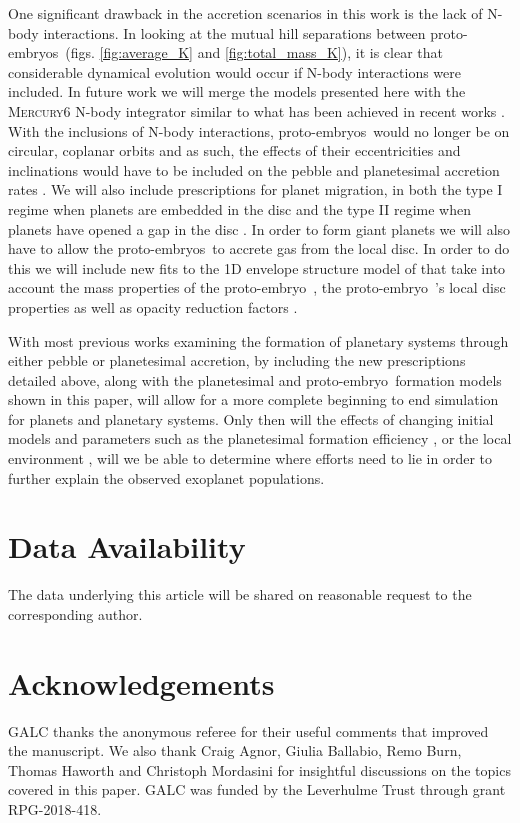 \documentclass[a4paper,fleqn,usenatbib]{mnras}
\newcommand{\emb}{{{proto-embryo~}}}
\newcommand{\embs}{{{proto-embryos~}}}
\begin{document}
One significant drawback in the accretion scenarios in this work is the lack of N-body interactions.
In looking at the mutual hill separations between \embs (figs. \ref{fig:average_K} and \ref{fig:total_mass_K}), it is clear that considerable dynamical evolution would occur if N-body interactions were included.
In future work we will merge the models presented here with the \textsc{Mercury6} N-body integrator \citep{Chambers} similar to what has been achieved in recent works \citep[e.g.][]{ColemanNelson14,ColemanNelson16,ColemanNelson16b,Marleau19,Coleman19}.
With the inclusions of N-body interactions, \embs would no longer be on circular, coplanar orbits and as such, the effects of their eccentricities and inclinations would have to be included on the pebble and planetesimal accretion rates \citep{Liu18,Ormel18}.
We will also include prescriptions for planet migration, in both the type I regime when planets are embedded in the disc \citep{pdk10,pdk11} and the type II regime when planets have opened a gap in the disc \citep{LinPapaloizou86}.
In order to form giant planets we will also have to allow the \embs to accrete gas from the local disc.
In order to do this we will include new fits to the 1D envelope structure model of \citet{CPN17} that take into account the mass properties of the \emb, the \emb's local disc properties as well as opacity reduction factors \citep{Poon21}.

With most previous works examining the formation of planetary systems through either pebble or planetesimal accretion, by including the new prescriptions detailed above, along with the planetesimal and \emb formation models shown in this paper, will allow for a more complete beginning to end simulation for planets and planetary systems.
Only then will the effects of changing initial models and parameters such as the planetesimal formation efficiency \citep{Lenz20}, or the local environment \citep{Sellek20,ColemanHaworth20}, will we be able to determine where efforts need to lie in order to further explain the observed exoplanet populations.

\section*{Data Availability}
The data underlying this article will be shared on reasonable request to the corresponding author.

\section*{Acknowledgements}
GALC thanks the anonymous referee for their useful comments that improved the manuscript.
We also thank Craig Agnor, Giulia Ballabio, Remo Burn, Thomas Haworth and Christoph Mordasini for insightful discussions on the topics covered in this paper.
GALC was funded by the Leverhulme Trust through grant RPG-2018-418.


{}
\label{lastpage}
\end{document}
